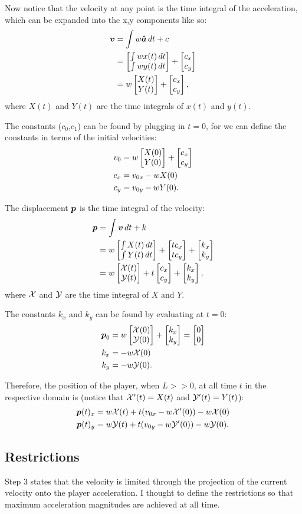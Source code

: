 Now notice that the velocity at any point is the time integral of the acceleration, which can be expanded into the x,y components like so:
\begin{align*}
    \boldsymbol{v} &= \int w\boldsymbol{\hat{a}} \,dt + c\\
    &= \begin{bmatrix}\int w x(t) \,dt\\ \int w y(t) \,dt \end{bmatrix} + \begin{bmatrix}c_x\\c_y \end{bmatrix}\\
    &= w\begin{bmatrix}X(t)\\Y(t) \end{bmatrix} + \begin{bmatrix}c_x\\c_y \end{bmatrix},
\end{align*}
where $X(t)$ and $Y(t)$ are the time integrals of $x(t)$ and $y(t)$.

The constants ($c_0$,$c_1$) can be found by plugging in $t=0$, for we can define the constants in terms of the initial velocities:
\begin{align*}
    v_0 &= w \begin{bmatrix}X(0)\\Y(0) \end{bmatrix} + \begin{bmatrix}c_x\\c_y \end{bmatrix}\\
    c_x &= v_{0x} -wX(0)\\
    c_y &= v_{0y} -wY(0).
\end{align*}

The displacement $\boldsymbol{p}$ is the time integral of the velocity:
\begin{align*}
    \boldsymbol{p} &= \int \boldsymbol{v} \, dt + k\\
    &= w \begin{bmatrix}\int X(t) \, dt\\\int Y(t) \, dt \end{bmatrix} + \begin{bmatrix}tc_x\\tc_y \end{bmatrix} + \begin{bmatrix}k_x\\k_y \end{bmatrix}\\
    &= w \begin{bmatrix}\mathcal{X}(t)\\\mathcal{Y}(t) \end{bmatrix}  + t\begin{bmatrix}c_x\\c_y \end{bmatrix}  + \begin{bmatrix}k_x\\k_y \end{bmatrix},
\end{align*}
where $\mathcal{X}$ and $\mathcal{Y}$ are the time integral of $X$ and $Y$.

The constants $k_x$ and $k_y$ can be found by evaluating at $t=0$:
\begin{align*}
    \boldsymbol{p}_0 &= w \begin{bmatrix}\mathcal{X}(0)\\\mathcal{Y}(0) \end{bmatrix} + \begin{bmatrix}k_x\\k_y \end{bmatrix} = \begin{bmatrix}0\\0 \end{bmatrix}\\
    k_x &= -w\mathcal{X}(0)\\
    k_y &= -w\mathcal{Y}(0).
\end{align*}

Therefore, the position of the player, when $L >> 0$, at all time $t$ in the respective domain is (notice that $\mathcal{X}'(t) = X(t)$ and $\mathcal{Y}'(t) = Y(t)$):
\begin{align*}
    \boldsymbol{p}(t)_x &= w\mathcal{X}(t) + t(v_{0x} - w\mathcal{X}'(0)) - w\mathcal{X}(0)\\
    \boldsymbol{p}(t)_y &= w\mathcal{Y}(t) + t(v_{0y} - w\mathcal{Y}'(0)) - w\mathcal{Y}(0).
\end{align*}

\subsection{Restrictions}
Step 3 states that the velocity is limited through the projection of the current velocity onto the player acceleration. I thought to define the restrictions so that maximum acceleration magnitudes are achieved at all time.

